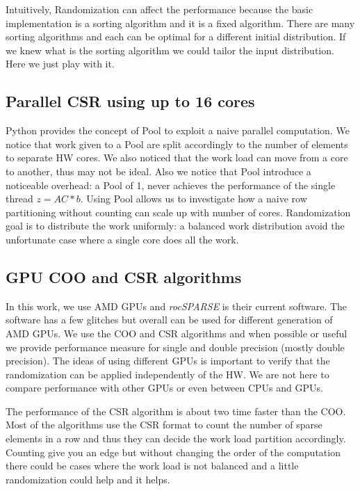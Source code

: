 \documentclass[manuscript,screen]{acmart}
\begin{document}
Intuitively, Randomization can affect the performance because the
basic implementation is a sorting algorithm and it is a fixed
algorithm. There are many sorting algorithms and each can be optimal
for a different initial distribution. If we knew what is the sorting
algorithm we could tailor the input distribution. Here we just play
with it.

\subsection{Parallel CSR using up to 16 cores}
\label{sec:parcpu}
Python provides the concept of Pool to exploit a naive parallel
computation. We notice that work given to a Pool are split accordingly
to the number of elements to separate HW cores. We also noticed that
the work load can move from a core to another, thus may not be
ideal. Also we notice that Pool introduce a noticeable overhead: a
Pool of 1, never achieves the performance of the single thread $z =
AC*b$. Using Pool allows us to investigate how a naive row
partitioning without counting can scale up with number of
cores. Randomization goal is to distribute the work uniformly: a
balanced work distribution avoid the unfortunate case where a single
core does all the work.


\subsection{GPU COO and CSR algorithms}
\label{sec:gpucoocsr}
In this work, we use AMD GPUs and {\em rocSPARSE} is their current
software. The software has a few glitches but overall can be used for
different generation of AMD GPUs. We use the COO and CSR algorithms
and when possible or useful we provide performance measure for single
and double precision (mostly double precision). The ideas of using
different GPUs is important to verify that the randomization can be
applied independently of the HW. We are not here to compare
performance with other GPUs or even between CPUs and GPUs.

The performance of the CSR algorithm is about two time faster than the
COO. Most of the algorithms use the CSR format to count the number of
sparse elements in a row and thus they can decide the work load
partition accordingly. Counting give you an edge but without changing
the order of the computation there could be cases where the work load
is not balanced and a little randomization could help and it helps.

\end{document}
